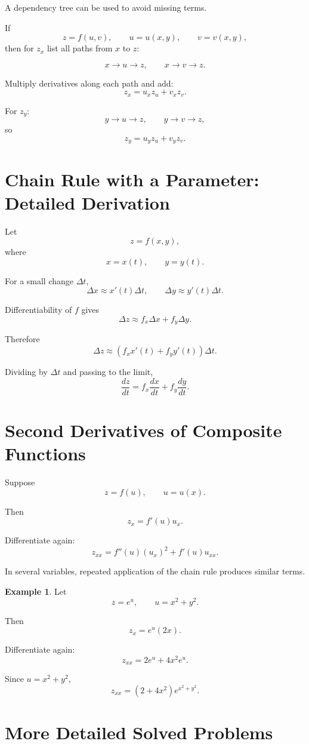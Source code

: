 \documentclass[11pt,oneside]{book}
\theoremstyle{studentthm}
\theoremstyle{definition}
\newtheorem{example}[theorem]{Example}
\begin{document}
A dependency tree can be used to avoid missing terms.

If
\[
z=f(u,v),
\qquad
u=u(x,y),
\qquad
v=v(x,y),
\]
then for \(z_x\) list all paths from \(x\) to \(z\):

\[
x\to u\to z,
\qquad
x\to v\to z.
\]

Multiply derivatives along each path and add:
\[
z_x
=
u_xz_u+v_xz_v.
\]

For \(z_y\):
\[
y\to u\to z,
\qquad
y\to v\to z,
\]
so
\[
z_y
=
u_yz_u+v_yz_v.
\]

\section{Chain Rule with a Parameter: Detailed Derivation}

Let
\[
z=f(x,y),
\]
where
\[
x=x(t),\qquad y=y(t).
\]

For a small change \(\Delta t\),
\[
\Delta x\approx x'(t)\Delta t,
\qquad
\Delta y\approx y'(t)\Delta t.
\]

Differentiability of \(f\) gives
\[
\Delta z
\approx
f_x\Delta x+f_y\Delta y.
\]

Therefore
\[
\Delta z
\approx
\left(
f_xx'(t)+f_yy'(t)
\right)\Delta t.
\]

Dividing by \(\Delta t\) and passing to the limit,
\[
\frac{dz}{dt}
=
f_x\frac{dx}{dt}
+
f_y\frac{dy}{dt}.
\]

\section{Second Derivatives of Composite Functions}

Suppose
\[
z=f(u),
\qquad
u=u(x).
\]

Then
\[
z_x=f'(u)u_x.
\]

Differentiate again:
\[
z_{xx}
=
f''(u)(u_x)^2
+
f'(u)u_{xx}.
\]

In several variables, repeated application of the chain rule produces
similar terms.

\begin{example}
Let
\[
z=e^u,
\qquad
u=x^2+y^2.
\]

Then
\[
z_x=e^u(2x).
\]

Differentiate again:
\[
z_{xx}
=
2e^u
+
4x^2e^u.
\]

Since \(u=x^2+y^2\),
\[
z_{xx}
=
(2+4x^2)e^{x^2+y^2}.
\]
\end{example}

\section{More Detailed Solved Problems}
\end{document}
